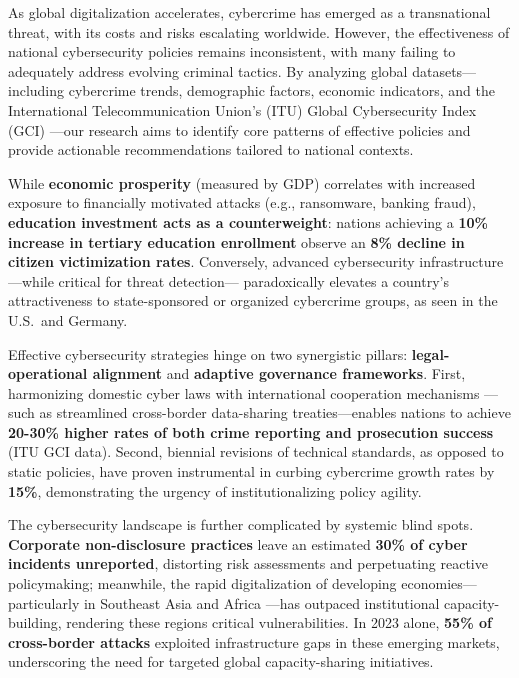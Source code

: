 
As global digitalization accelerates,
cybercrime has emerged as a transnational threat, with its costs and risks escalating worldwide.
However, the effectiveness of national cybersecurity policies remains inconsistent,
with many failing to adequately address evolving criminal tactics.
By analyzing global datasets—including cybercrime trends, demographic factors, economic indicators,
and the International Telecommunication Union’s (ITU) Global Cybersecurity Index (GCI)
—our research aims to identify core patterns of effective policies and
provide actionable recommendations tailored to national contexts.



While \textbf{economic prosperity} (measured by GDP) correlates with increased exposure to financially
motivated attacks (e.g., ransomware, banking fraud), \textbf{education investment acts as a counterweight}:
nations achieving a \textbf{10\% increase in tertiary education enrollment}
observe an \textbf{8\% decline in citizen victimization rates}.
Conversely, advanced cybersecurity infrastructure—while critical for threat detection—
paradoxically elevates a country’s attractiveness to state-sponsored or organized cybercrime groups,
as seen in the U.S.\ and Germany.

Effective cybersecurity strategies hinge on two synergistic pillars:
\textbf{legal-operational alignment} and \textbf{adaptive governance frameworks}.
First, harmonizing domestic cyber laws with international cooperation mechanisms
—such as streamlined cross-border data-sharing treaties—enables nations to achieve
\textbf{20-30\% higher rates of both crime reporting and prosecution success} (ITU GCI data).
Second, biennial revisions of technical standards, as opposed to static policies,
have proven instrumental in curbing cybercrime growth rates by \textbf{15\%},
demonstrating the urgency of institutionalizing policy agility.

The cybersecurity landscape is further complicated by systemic blind spots.
\textbf{Corporate non-disclosure practices} leave an estimated \textbf{30\% of cyber incidents unreported},
distorting risk assessments and perpetuating reactive policymaking;
meanwhile, the rapid digitalization of developing economies—particularly in Southeast Asia and Africa
—has outpaced institutional capacity-building, rendering these regions critical vulnerabilities.
In 2023 alone, \textbf{55\% of cross-border attacks} exploited infrastructure gaps in these emerging markets,
underscoring the need for targeted global capacity-sharing initiatives.


